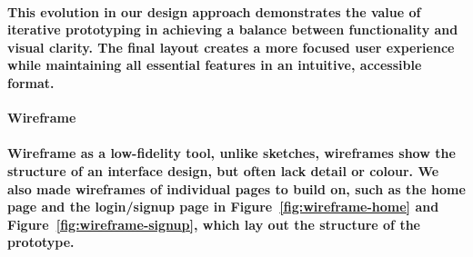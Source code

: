 \paragraph{This evolution in our design approach demonstrates the value of iterative prototyping in achieving a balance between functionality and visual clarity. The final layout creates a more focused user experience while maintaining all essential features in an intuitive, accessible format.}

\item \textbf{Wireframe}
\paragraph{Wireframe as a low-fidelity tool, unlike sketches, wireframes show the structure of an interface design, but often lack detail or colour. We also made wireframes of individual pages to build on, such as the home page and the login/signup page in Figure~\ref{fig:wireframe-home} and Figure~\ref{fig:wireframe-signup}, which lay out the structure of the prototype.}
